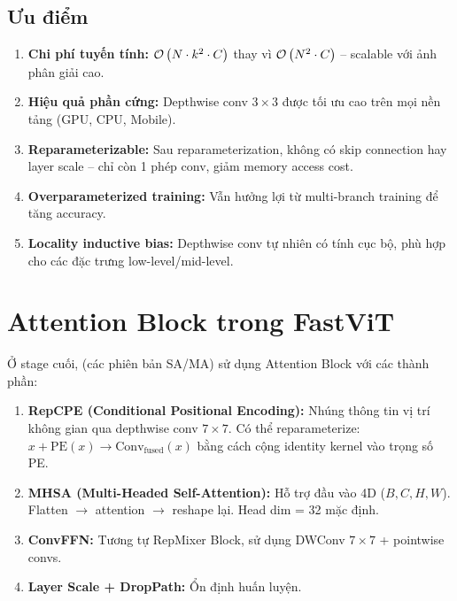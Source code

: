 \subsection{Ưu điểm}
\label{subsec:repmixer_advantages}

\begin{enumerate}
    \item \textbf{Chi phí tuyến tính:} $\mathcal{O}\left(N \cdot k^2 \cdot C\right)$ thay vì $\mathcal{O}\left(N^2 \cdot C\right)$ -- scalable với ảnh phân giải cao.
    
    \item \textbf{Hiệu quả phần cứng:} Depthwise conv $3 \times 3$ được tối ưu cao trên mọi nền tảng (GPU, CPU, Mobile).
    
    \item \textbf{Reparameterizable:} Sau reparameterization, không có skip connection hay layer scale -- chỉ còn 1 phép conv, giảm memory access cost.
    
    \item \textbf{Overparameterized training:} Vẫn hưởng lợi từ multi-branch training để tăng accuracy.
    
    \item \textbf{Locality inductive bias:} Depthwise conv tự nhiên có tính cục bộ, phù hợp cho các đặc trưng low-level/mid-level.
\end{enumerate}

\section{Attention Block trong FastViT}
\label{sec:attention_block}

Ở stage cuối, \fastvit{} (các phiên bản SA/MA) sử dụng Attention Block với các thành phần:

\begin{enumerate}
    \item \textbf{RepCPE (Conditional Positional Encoding):} Nhúng thông tin vị trí không gian qua depthwise conv $7 \times 7$. Có thể reparameterize: $x + \text{PE}(x) \to \text{Conv}_{\text{fused}}(x)$ bằng cách cộng identity kernel vào trọng số PE.
    
    \item \textbf{MHSA (Multi-Headed Self-Attention):} Hỗ trợ đầu vào 4D ($B, C, H, W$). Flatten $\to$ attention $\to$ reshape lại. Head dim = 32 mặc định.
    
    \item \textbf{ConvFFN:} Tương tự RepMixer Block, sử dụng DWConv $7 \times 7$ + pointwise convs.
    
    \item \textbf{Layer Scale + DropPath:} Ổn định huấn luyện.
\end{enumerate}


